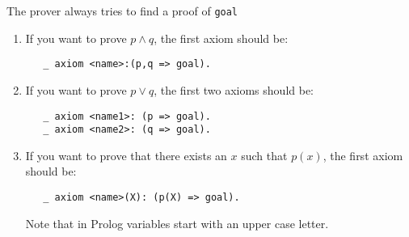 \documentclass{article}
\begin{document}
The prover always tries to find a proof of \texttt{goal}
\begin{enumerate}
\item If you want to prove $p \wedge q$, the first axiom should be:
\begin{verbatim}
   _ axiom <name>:(p,q => goal).
\end{verbatim}
\item If you want to prove $p \vee q$, the first two axioms should be:
\begin{verbatim}
   _ axiom <name1>: (p => goal).
   _ axiom <name2>: (q => goal).
\end{verbatim}
\item If you want to prove that there exists an $x$ such that $p(x)$,
  the first axiom should be:
\begin{verbatim} 
   _ axiom <name>(X): (p(X) => goal).
\end{verbatim}
   Note that in Prolog variables start with an upper case letter.


\end{enumerate}
\end{document}

